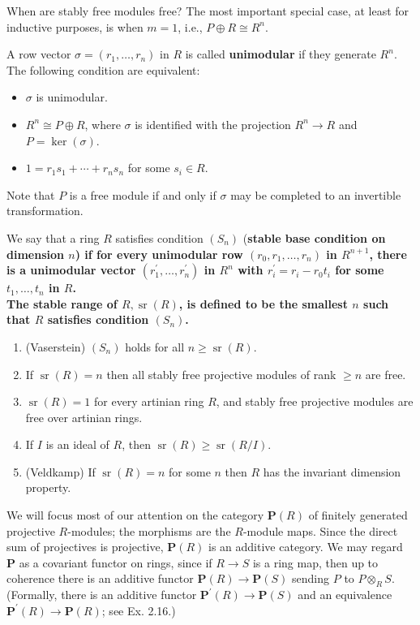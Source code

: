 When are stably free modules free? The most important special case, at least for inductive purposes, is when $m=1$, i.e., $P \oplus R \cong R^n$.

A row vector $\sigma = (r_1, \ldots, r_n)$ in $R$ is called \textbf{unimodular} if they generate $R^n$. The following condition are equivalent:
\begin{itemize}
    \item $\sigma$ is unimodular.
    \item $R^n \cong P \oplus R$, where $\sigma$ is identified with the projection $R^n \rightarrow R$ and $P=\operatorname{ker}(\sigma)$.
    \item $1=r_1 s_1+\cdots+r_n s_n$ for some $s_i \in R$.
\end{itemize}
Note that $P$ is a free module if and only if $\sigma$ may be completed to an invertible transformation.

We say that a ring $R$ satisfies condition $(S_n)$ (\bf{stable base condition on dimension $n$}) if for every unimodular row $\left(r_0, r_1, \ldots, r_n\right)$ in $R^{n+1}$, there is a unimodular vector $\left(r_1^{\prime}, \ldots, r_n^{\prime}\right)$ in $R^n$ with $r_i^{\prime}=r_i-r_0 t_i$ for some $t_1, \ldots, t_n$ in $R$.\\
The {\bfseries stable range} of $R, \operatorname{sr}(R)$, is defined to be the smallest $n$ such that $R$ satisfies condition $\left(S_n\right)$.

\begin{prop}
    \begin{enumerate}
        \item (Vaserstein) $\left(S_n\right)$ holds for all $n \geq \operatorname{sr}(R)$.
        \item If $\operatorname{sr}(R)=n$ then all stably free projective modules of rank $\geq n$ are free.
        \item $\operatorname{sr}(R)=1$ for every artinian ring $R$, and stably free projective modules are free over artinian rings.
        \item If $I$ is an ideal of $R$, then $\operatorname{sr}(R) \geq \operatorname{sr}(R / I)$.
        \item (Veldkamp) If $\operatorname{sr}(R)=n$ for some $n$ then $R$ has the invariant dimension property.
    \end{enumerate}
\end{prop}

We will focus most of our attention on the category $\mathbf{P}(R)$ of finitely generated projective $R$-modules; the morphisms are the $R$-module maps. Since the direct sum of projectives is projective, $\mathbf{P}(R)$ is an additive category. We may regard $\mathbf{P}$ as a covariant functor on rings, since if $R \rightarrow S$ is a ring map, then up to coherence there is an additive functor $\mathbf{P}(R) \rightarrow \mathbf{P}(S)$ sending $P$ to $P \otimes_R S$. (Formally, there is an additive functor $\mathbf{P}^{\prime}(R) \rightarrow \mathbf{P}(S)$ and an equivalence $\mathbf{P}^{\prime}(R) \rightarrow \mathbf{P}(R)$; see Ex. 2.16.)

